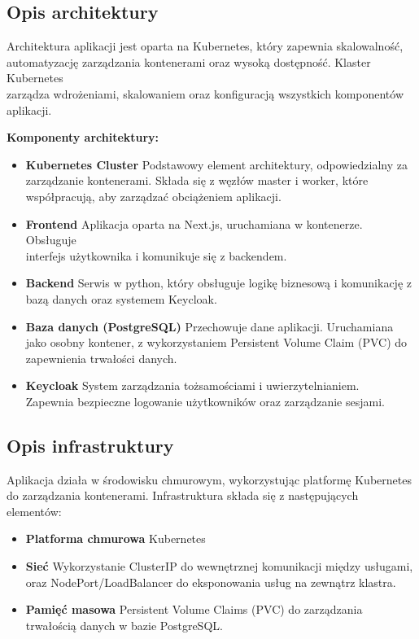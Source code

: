 \documentclass[12pt,a4paper]{article}
\begin{document}
\subsection{Opis architektury}
\label{sec:introduction}
Architektura aplikacji jest oparta na Kubernetes, który zapewnia skalowalność,\\ automatyzację zarządzania kontenerami oraz wysoką dostępność. Klaster Kubernetes \\ zarządza wdrożeniami, skalowaniem oraz konfiguracją wszystkich komponentów aplikacji.

\textbf{Komponenty architektury:}
\begin{itemize}
    \item \textbf{Kubernetes Cluster} Podstawowy element architektury, odpowiedzialny za \\zarządzanie kontenerami. Składa się z węzłów master i worker, które współpracują, aby zarządzać obciążeniem aplikacji.
    \item \textbf{Frontend} Aplikacja oparta na Next.js, uruchamiana w kontenerze. Obsługuje \\interfejs użytkownika i komunikuje się z backendem.
    \item \textbf{Backend} Serwis w python, który obsługuje logikę biznesową i komunikację z bazą danych oraz systemem Keycloak.
    \item \textbf{Baza danych (PostgreSQL)} Przechowuje dane aplikacji. Uruchamiana jako osobny kontener, z wykorzystaniem Persistent Volume Claim (PVC) do zapewnienia trwałości danych.
    \item \textbf{Keycloak} System zarządzania tożsamościami i uwierzytelnianiem.\\ Zapewnia bezpieczne logowanie użytkowników oraz zarządzanie sesjami.
\end{itemize}

\subsection{Opis infrastruktury}
\label{sec:Users}

Aplikacja działa w środowisku chmurowym, wykorzystując platformę Kubernetes do zarządzania kontenerami. Infrastruktura składa się z następujących elementów:
\begin{itemize}
    \item \textbf{Platforma chmurowa} Kubernetes
    \item \textbf{Sieć} Wykorzystanie ClusterIP do wewnętrznej komunikacji między usługami, oraz NodePort/LoadBalancer do eksponowania usług na zewnątrz klastra.
    \item \textbf{Pamięć masowa} Persistent Volume Claims (PVC) do zarządzania trwałością danych w bazie PostgreSQL.
\end{itemize}
\end{document}
